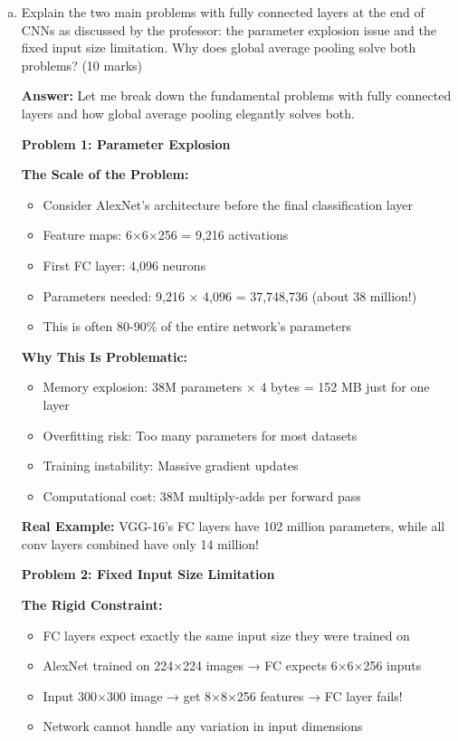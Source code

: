 \documentclass[12pt]{article}
\newcommand{\answer}[1]{{\color{answercolor}\textbf{Answer:} #1}}
\newcommand{\explanation}[1]{{\color{explanationcolor}#1}}
\begin{document}
\begin{enumerate}[(a)]
    \item Explain the two main problems with fully connected layers at the end of CNNs as discussed by the professor: the parameter explosion issue and the fixed input size limitation. Why does global average pooling solve both problems? \hfill (10 marks)
    
    \answer{
    Let me break down the fundamental problems with fully connected layers and how global average pooling elegantly solves both.
    
    \textbf{Problem 1: Parameter Explosion}
    
    \explanation{
    \textbf{The Scale of the Problem:}
    \begin{itemize}
        \item Consider AlexNet's architecture before the final classification layer
        \item Feature maps: 6×6×256 = 9,216 activations
        \item First FC layer: 4,096 neurons
        \item Parameters needed: 9,216 × 4,096 = 37,748,736 (about 38 million!)
        \item This is often 80-90\% of the entire network's parameters
    \end{itemize}
    
    \textbf{Why This Is Problematic:}
    \begin{itemize}
        \item Memory explosion: 38M parameters × 4 bytes = 152 MB just for one layer
        \item Overfitting risk: Too many parameters for most datasets
        \item Training instability: Massive gradient updates
        \item Computational cost: 38M multiply-adds per forward pass
    \end{itemize}
    
    \textbf{Real Example:}
    VGG-16's FC layers have 102 million parameters, while all conv layers combined have only 14 million!
    }
    
    \textbf{Problem 2: Fixed Input Size Limitation}
    
    \explanation{
    \textbf{The Rigid Constraint:}
    \begin{itemize}
        \item FC layers expect exactly the same input size they were trained on
        \item AlexNet trained on 224×224 images → FC expects 6×6×256 inputs
        \item Input 300×300 image → get 8×8×256 features → FC layer fails!
        \item Network cannot handle any variation in input dimensions
    \end{itemize}
    
}}
\end{enumerate}
\end{document}
